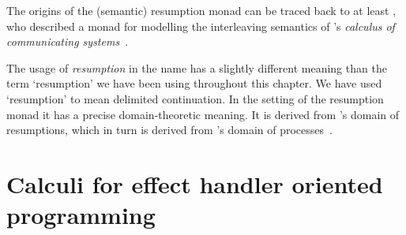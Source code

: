 \documentclass[12pt,phd,lfcs,twoside,openright,logo,leftchapter,normalheadings]{infthesis}
\theoremstyle{plain}
\theoremstyle{definition}
\begin{document}
The origins of the (semantic) resumption monad can be traced back to
at least \citet{Moggi90}, who described a monad for modelling the
interleaving semantics of \citeauthor{Milner75}'s \emph{calculus of
  communicating systems}~\cite{Milner75}.

The usage of \emph{resumption} in the name has a slightly different
meaning than the term `resumption' we have been using throughout this
chapter. We have used `resumption' to mean delimited continuation. In
the setting of the resumption monad it has a precise domain-theoretic
meaning. It is derived from \citeauthor{Plotkin76}'s domain of
resumptions, which in turn is derived from \citeauthor{Milner75}'s
domain of processes~\cite{Milner75,Plotkin76}.






\chapter{Calculi for effect handler oriented programming}
\label{ch:handler-calculi}
\end{document}
